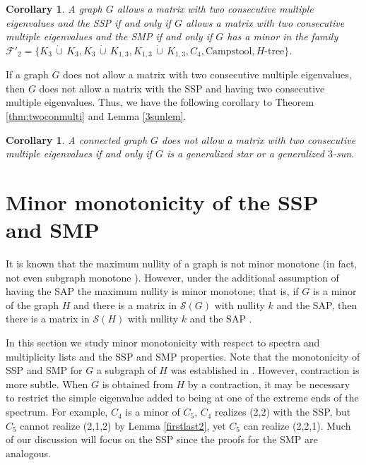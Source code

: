 \documentclass[11pt]{article}
\newtheorem{cor}[thm]{Corollary}
\theoremstyle{definition}
\theoremstyle{definition}
\theoremstyle{definition}
\newcommand{\dcup}{\,\dot{\cup}\,}
\begin{document}
\begin{cor}
A graph $G$ allows a matrix with two consecutive multiple eigenvalues and the SSP if and only if $G$ allows a matrix with two consecutive multiple eigenvalues and the SMP if and only if $G$ has a minor in the family $\mathcal{F}'_2=\{K_3\dcup K_3, K_3\dcup K_{1,3}, K_{1,3}\dcup K_{1,3}, C_4, \text{Campstool}, H\text{-tree}\}$.
\end{cor}

If a graph $G$ does not allow a matrix with two consecutive multiple eigenvalues, then $G$ does not allow a matrix with the SSP and having two consecutive multiple eigenvalues.  Thus, we have the following corollary to Theorem \ref{thm:twoconmulti} and Lemma \ref{3sunlem}.

\begin{cor}
A connected graph $G$ does not allow a matrix with two consecutive multiple eigenvalues if and only if $G$ is a generalized star or a generalized $3$-sun.
\end{cor}



\section{Minor monotonicity of the SSP and SMP}\label{sminormon}


It is known that the maximum nullity of a graph is not minor monotone (in fact, not even subgraph monotone \cite[Example 5.1]{BFH}). However, 
under the additional assumption of having the SAP  the maximum nullity is minor monotone; that is, if $G$ is a minor of the graph $H$
and there is a matrix in $\mathcal{S}(G)$ with nullity $k$ and the SAP, then there is a matrix in $\mathcal{S}(H)$ with nullity $k$ 
and the SAP \cite{BFH3}. 

In this section we study  minor monotonicity  with respect to spectra and multiplicity lists 
and the SSP and SMP properties.   Note that the monotonicity of SSP and SMP for $G$ a  subgraph of $H$ was established in \cite{genSAP}.  However,  contraction is more subtle.    When $G$ is obtained from $H$ by a contraction, it may be necessary to restrict the simple eigenvalue added to being  at one of the extreme ends of the spectrum.  For example, $C_4$ is a minor of $C_5$, $C_4$ realizes (2,2) with the SSP, but  $C_5$ cannot realize (2,1,2) by Lemma \ref{firstlast2}, yet $C_5$  can  realize (2,2,1).  
{Much of our discussion will focus on the SSP since the proofs for the SMP are analogous. }
\end{document}
